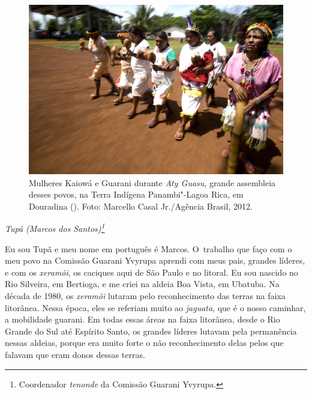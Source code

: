 
\begin{vplace}
\begin{figure}[H]
  \centering
  \includegraphics[width=\textwidth]{./img/GUARANIS-img1.jpg}	
  \hfill
  \caption{Mulheres Kaiowá e Guarani durante \emph{Aty Guasu}, grande assembleia desses
povos, na Terra Indígena Panambi"-Lagoa Rica, em Douradina (). Foto:
Marcello Casal Jr./Agência Brasil, 2012.}
\end{figure}
\end{vplace}

\@openrighttrue\makeatother
\begin{flushright}
\emph{Tupã (Marcos dos Santos)\footnote{Coordenador \emph{tenonde} da Comissão
Guarani Yvyrupa.}}
\end{flushright}
\medskip

\noindent
Eu sou Tupã e meu nome em português é Marcos. O~trabalho que faço com o
meu povo na Comissão Guarani Yvyrupa aprendi com meus pais, grandes
líderes, e com os \emph{xeramõi}, os caciques aqui de São Paulo e no litoral.
Eu sou nascido no Rio Silveira, em Bertioga, e me criei na aldeia Boa
Vista, em Ubatuba. Na década de 1980, os \emph{xeramõi} lutaram pelo
reconhecimento das terras na faixa litorânea. Nessa época, eles se
referiam muito ao \emph{jaguata}, que é o nosso caminhar, a mobilidade
guarani. Em todas essas áreas na faixa litorânea, desde o Rio Grande do
Sul até Espírito Santo, os grandes líderes lutavam pela permanência
nessas aldeias, porque era muito forte o não reconhecimento delas pelos
que falavam que eram donos dessas terras. 

